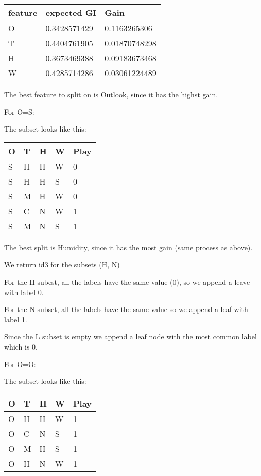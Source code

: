 \documentclass[12pt, fullpage,letterpaper]{article}
\begin{document}
\begin{enumerate}
\begin{enumerate}
		\begin{tabular}{|l|l|l|}
			\hline
			feature & expected GI  & Gain          \\ \hline
			O       & 0.3428571429 & 0.1163265306  \\ \hline
			T       & 0.4404761905 & 0.01870748298 \\ \hline
			H       & 0.3673469388 & 0.09183673468 \\ \hline
			W       & 0.4285714286 & 0.03061224489 \\ \hline
			\end{tabular}

The best feature to split on is Outlook, since it has the highst gain. 

For O=S:

The subset looks like this:

\begin{tabular}{|l|l|l|l|l|}
	\hline
	O & T & H & W & Play \\ \hline
	S & H & H & W & 0    \\ \hline
	S & H & H & S & 0    \\ \hline
	S & M & H & W & 0    \\ \hline
	S & C & N & W & 1    \\ \hline
	S & M & N & S & 1    \\ \hline
	\end{tabular}

The best split is Humidity, since it has the most gain (same process as above).

We return id3 for the subsets (H, N)

For the H subest, all the labels have the same value (0), so we append a leave with label 0.

For the N subset, all the labels have the same value so we append a leaf with label 1.

Since the L subset is empty  we append a leaf node with the most common label which is 0. 

For O=O:

The subset looks like this:

\begin{tabular}{|l|l|l|l|l|}
	\hline
	O & T & H & W & Play \\ \hline
	O & H & H & W & 1    \\ \hline
	O & C & N & S & 1    \\ \hline
	O & M & H & S & 1    \\ \hline
	O & H & N & W & 1    \\ \hline
	\end{tabular}



\end{enumerate}
\end{enumerate}
\end{document}
